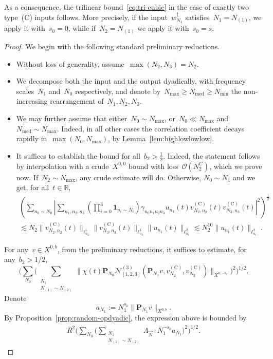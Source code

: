 \documentclass[11pt,reqno,english]{amsart}
\numberwithin{equation}{section}
\theoremstyle{plain}
\theoremstyle{definition}
\theoremstyle{remark}
\newcommand{\R}{\mathbb{R}}
\begin{document}
	As a consequence, the trilinear bound~\eqref{eq:tri-cubic} in the case of exactly two type~(C) inputs follows. More precisely, if the input~$w_{N_1}^{\dag}$ satisfies~$N_1=N_{(1)}$, we apply it with~$s_0=0$, while if~$N_2=N_{(1)}$ we apply it with~$s_0=s$.
	
	\begin{proof}
		We begin with the following standard preliminary reductions.
		\begin{itemize}
			\item Without loss of generality, assume~$\max(N_{2},N_{3})=N_{2}$.
			\item We decompose both the input and the output dyadically, with frequency scales~$N_{1}$ and~$N_{0}$ respectively, and denote by~$N_{\max}\geq N_{\mathrm{med}}\geq N_{\min}$ the non-increasing rearrangement of~$N_{1},N_{2},N_{3}$.
			\item We may further assume that either~$N_{0}\sim N_{\max}$, or~$N_{0}\ll N_{\max}$ and~$N_{\mathrm{med}}\sim N_{\max}$.
			Indeed, in all other cases the correlation coefficient decays rapidly in~$\max(N_{0},N_{\max})$, by Lemma~\ref{lem:highlowlowlow}.
			\item It suffices to establish the bound for all~$b_{2}>\frac12$.
			Indeed, the statement follows by interpolation with a crude~$X^{0,0}$ bound with loss~$\mathcal{O}(N_{2}^{C})$, which we prove now. If~$N_{2}\sim N_{\max}$, any crude estimate will do. Otherwise, $N_{0}\sim N_{1}$ and we get, for all~$t\in\R$,
			\begin{multline*}
				\left(
				\sum_{n_{0}\sim N_{0}}
				\left|\sum_{n_{1},n_{2},n_{3}}
				\left(
				\prod_{i=0}^{3}\mathbf{1}_{n_{i}\sim N_{i}}
				\right)
				\gamma_{n_{0}n_{1}n_{2}n_{3}}
				u_{n_{1}}(t)v_{N_{2},n_{2}}^{(\mathrm{C})}(t)v_{N_{3},n_{3}}^{(\mathrm{C})}(t)
				\right|^{2}
				\right)^{\frac{1}{2}}
				\\
				\lesssim N_{2}\|v_{N_{2},n_{2}}^{(\mathrm{C})}(t)\|_{\ell_{n_{2}}^{1}}
				\|v_{N_{3},n_{3}}^{(\mathrm{C})}(t)\|_{\ell_{n_{3}}^{1}}\|u_{n_{1}}(t)\|_{\ell_{n_{1}}^{2}}
				\lesssim N_{2}^{10}\|u_{n_{1}}(t)\|_{\ell_{n_{1}}^{2}}\,.
			\end{multline*}
		\end{itemize}
		For any~$v\in X^{0,b}$, from the preliminary reductions, it suffices to estimate, for any~$b_2>1/2$,
		\[
		\Big(
		\sum_{N_0}\Big(\sum_{\substack{N_1\\
				N_{(1)}\sim N_{(2)}
		}}
		\big\|\chi(t)\mathbf{P}_{N_0}\mathcal{N}_{[1,2,3]}^{(3)}(\mathbf{P}_{N_1}v,v_{N_2}^{(\mathrm{C})},v_{N_3}^{(\mathrm{C})}) \big\|_{X^{0,-b_2}}
		\Big)^2
		\Big)^{1/2}.
		\]
		Denote
		\[
		a_{N_1}:=N_1^{s_0}\|\mathbf{P}_{N_1}v\|_{X^{0,b}}.
		\]
		By Proposition~\ref{prop:random-opdyadic}, the expression above is bounded by
		\begin{align}\label{din'}
			R^2\Big(\sum_{N_0}
			\Big(
			\sum_{\substack{N_1\\
					N_{(1)}\sim N_{(2)}
			} } \Lambda_{\vec{N}}
			\cdot N_1^{-s_0} a_{N_1}
			\Big)^2
			\Big)^{1/2}.
		\end{align}
		

\end{proof}
\end{document}
